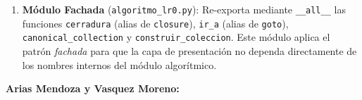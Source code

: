 \begin{enumerate}
\begin{enumerate}[label=\alph*.]
      \item \textbf{\texttt{\_format\_items(grammar, items)}} $\to$ \texttt{str}:
        función auxiliar privada que convierte un conjunto de ítems LR(0) a una
        representación de cadena legible, insertando el símbolo $\bullet$ en la posición
        correcta del cuerpo de cada producción. Usada exclusivamente para poblar la traza.
    \end{enumerate}

  \item \textbf{Módulo Fachada} (\texttt{algoritmo\_lr0.py}):
    Re-exporta mediante \texttt{\_\_all\_\_} las funciones \texttt{cerradura} (alias de
    \texttt{closure}), \texttt{ir\_a} (alias de \texttt{goto}), \texttt{canonical\_collection}
    y \texttt{construir\_coleccion}. Este módulo aplica el patrón \textit{fachada} para
    que la capa de presentación no dependa directamente de los nombres internos del módulo
    algorítmico.
\end{enumerate}

\vspace{0.6cm}

\textbf{Arias Mendoza y Vasquez Moreno:}

